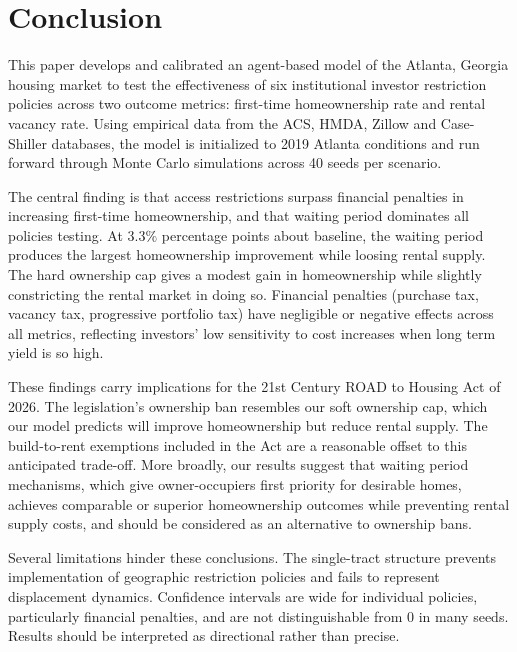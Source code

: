 \documentclass[twocolumn,showpacs,%
  nofootinbib,aps,superscriptaddress,%
  eqsecnum,prd,notitlepage,showkeys,10pt]{revtex4-1}
\begin{document}
\section{Conclusion}
This paper develops and calibrated an agent-based model of the Atlanta, Georgia housing market to test the effectiveness of six institutional investor restriction policies across two outcome metrics: first-time homeownership rate and rental vacancy rate. Using empirical data from the ACS, HMDA, Zillow and Case-Shiller databases, the model is initialized to 2019 Atlanta conditions and run forward through Monte Carlo simulations across 40 seeds per scenario. \newline

The central finding is that access restrictions surpass financial penalties in increasing first-time homeownership, and that waiting period dominates all policies testing. At $3.3\%$ percentage points about baseline, the waiting period produces the largest homeownership improvement while loosing rental supply. The hard ownership cap gives a modest gain in homeownership while slightly constricting the rental market in doing so. Financial penalties (purchase tax, vacancy tax, progressive portfolio tax) have negligible or negative effects across all metrics, reflecting investors' low sensitivity to cost increases when long term yield is so high. \newline

These findings carry implications for the 21st Century ROAD to Housing Act of 2026. The legislation's ownership ban resembles our soft ownership cap, which our model predicts will improve homeownership but reduce rental supply. The build-to-rent exemptions included in the Act are a reasonable offset to this anticipated trade-off. More broadly, our results suggest that waiting period mechanisms, which give owner-occupiers first priority for desirable homes, achieves comparable or superior homeownership outcomes while preventing rental supply costs, and should be considered as an alternative to ownership bans. \newline

Several limitations hinder these conclusions. The single-tract structure prevents implementation of geographic restriction policies and fails to represent displacement dynamics. Confidence intervals are wide for individual policies, particularly financial penalties, and are not distinguishable from 0 in many seeds. Results should be interpreted as directional rather than precise. \newline
\end{document}
